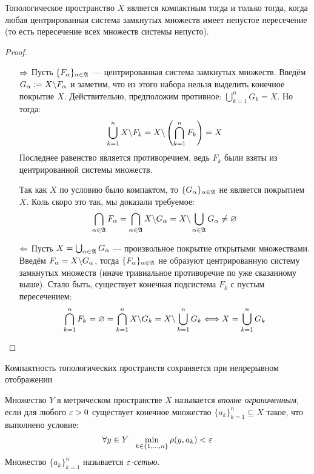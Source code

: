 \begin{theorem}
	Топологическое пространство $X$ является компактным тогда и только тогда, когда любая центрированная система замкнутых множеств имеет непустое пересечение (то есть пересечение всех множеств системы непусто).
\end{theorem}

\begin{proof}~
	\begin{itemize}
		\item[$\Rightarrow$] Пусть $\{F_\alpha\}_{\alpha \in \mathfrak{A}}$ --- центрированная система замкнутых множеств. Введём $G_\alpha := X \backslash F_\alpha$ и заметим, что из этого набора нельзя выделить конечное покрытие $X$. Действительно, предположим противное: $\bigcup_{k = 1}^n G_k = X$. Но тогда:
		\[
			\bigcup_{k = 1}^n X \backslash F_k = X \backslash \left(\bigcap_{k = 1}^n F_k\right) = X
		\]
		Последнее равенство является противоречием, ведь $F_k$ были взяты из центрированной системы множеств.
		
		Так как $X$ по условию было компактом, то $\{G_\alpha\}_{\alpha \in \mathfrak{A}}$ не является покрытием $X$. Коль скоро это так, мы доказали требуемое:
		\[
			\bigcap_{\alpha \in \mathfrak{A}} F_\alpha = \bigcap_{\alpha \in \mathfrak{A}} X \backslash G_\alpha = X \backslash \bigcup_{\alpha \in \mathfrak{A}} G_\alpha \neq \varnothing
		\]
		
		\item[$\Leftarrow$] Пусть $X = \bigcup_{\alpha \in \mathfrak{A}} G_\alpha$ --- произвольное покрытие открытыми множествами. Введём $F_\alpha = X \backslash G_\alpha$, тогда $\{F_\alpha\}_{\alpha \in \mathfrak{A}}$ не образуют центрированную систему замкнутых множеств (иначе тривиальное противоречие по уже сказанному выше). Стало быть, существует конечная подсистема $F_k$ с пустым пересечением:
		\[
			\bigcap_{k = 1}^n F_k = \varnothing = \bigcap_{k = 1}^n X \backslash G_k = X \backslash \bigcup_{k = 1}^n G_k \Longleftrightarrow X = \bigcup_{k = 1}^n G_k
		\]
	\end{itemize}
\end{proof}

\begin{exercise}
	Компактность топологических пространств сохраняется при непрерывном отображении
\end{exercise}

\begin{definition}
	Множество $Y$ в метрическом пространстве $X$ называется \textit{вполне ограниченным}, если для любого $\varepsilon > 0$ существует конечное множество $\{a_k\}_{k = 1}^n \subseteq X$ такое, что выполнено условие:
	\[
		\forall y \in Y\ \ \min_{k \in \{1, \ldots, n\}} \rho(y, a_k) < \varepsilon
	\]
	Множество $\{a_k\}_{k = 1}^n$ называется \textit{$\varepsilon$-сетью}.
\end{definition}

